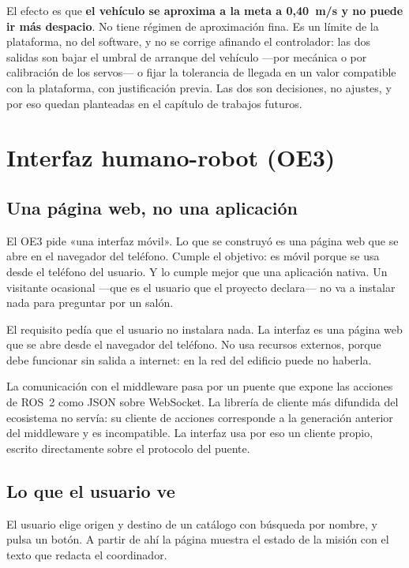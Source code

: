 El efecto es que \textbf{el vehículo se aproxima a la meta a 0,40~m/s y no puede
ir más despacio}. No tiene régimen de aproximación fina. Es un límite de la
plataforma, no del software, y no se corrige afinando el controlador: las dos
salidas son bajar el umbral de arranque del vehículo —por mecánica o por
calibración de los servos— o fijar la tolerancia de llegada en un valor
compatible con la plataforma, con justificación previa. Las dos son decisiones,
no ajustes, y por eso quedan planteadas en el capítulo de trabajos futuros.

\section{Interfaz humano-robot (OE3)}

\subsection{Una página web, no una aplicación}

El OE3 pide «una interfaz móvil». Lo que se construyó es una página web que se
abre en el navegador del teléfono. Cumple el objetivo: es móvil porque se usa
desde el teléfono del usuario. Y lo cumple mejor que una aplicación nativa. Un
visitante ocasional —que es el usuario que el proyecto declara— no va a instalar
nada para preguntar por un salón.

El requisito pedía que el usuario no instalara nada. La interfaz es una página
web que se abre desde el navegador del teléfono. No usa recursos externos,
porque debe funcionar sin salida a internet: en la red del edificio puede no
haberla.

La comunicación con el middleware pasa por un puente que expone las acciones de
ROS~2 como JSON sobre WebSocket. La librería de cliente más difundida del
ecosistema no servía: su cliente de acciones corresponde a la generación anterior
del middleware y es incompatible. La interfaz usa por eso un cliente propio,
escrito directamente sobre el protocolo del puente.

\subsection{Lo que el usuario ve}

El usuario elige origen y destino de un catálogo con búsqueda por nombre, y pulsa
un botón. A partir de ahí la página muestra el estado de la misión con el texto
que redacta el coordinador.

